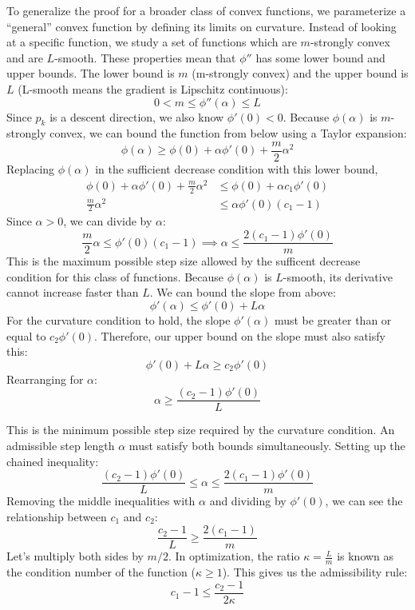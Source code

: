 To generalize the proof for a broader class of convex functions, we parameterize a ``general'' convex function by defining its limits on curvature. Instead of looking at a specific function, we study a set of functions which are $m$-strongly convex and are $L$-smooth.
These properties mean that $\phi''$ has some lower bound and upper bounds. The lower bound is $m$ (m-strongly convex) and the upper bound is $L$ (L-smooth means the gradient is Lipschitz continuous):
\[
    0 < m \leq \phi''(\alpha) \leq L
\]
Since $p_k$ is a descent direction, we also know $\phi'(0) < 0$.
Because $\phi(\alpha)$ is $m$-strongly convex, we can bound the function from below using a Taylor expansion:
\[
    \phi(\alpha) \geq \phi(0) + \alpha \phi'(0) + \frac{m}{2}\alpha^2
\]
Replacing $\phi(\alpha)$ in the sufficient decrease condition with this lower bound,
\begin{align*}
    \phi(0) + \alpha \phi'(0) + \frac{m}{2}\alpha^2 & \leq \phi(0) + \alpha c_1 \phi'(0) \\
    \frac{m}{2}\alpha^2                             & \leq \alpha \phi'(0)(c_1 - 1)
\end{align*}
Since $\alpha > 0$, we can divide by $\alpha$:
\[
    \frac{m}{2}\alpha \leq \phi'(0)(c_1 - 1) \implies \alpha \leq \frac{2(c_1 - 1)\phi'(0)}{m}
\]
This is the maximum possible step size allowed by the sufficent decrease condition for this class of functions.
Because $\phi(\alpha)$ is $L$-smooth, its derivative cannot increase faster than $L$. We can bound the slope from above:
\[
    \phi'(\alpha) \leq \phi'(0) + L\alpha
\]
For the curvature condition to hold, the slope $\phi'(\alpha)$ must be greater than or equal to $c_2 \phi'(0)$. Therefore, our upper bound on the slope must also satisfy this:
\[
    \phi'(0) + L\alpha \geq c_2 \phi'(0)
\]
Rearranging for $\alpha$:
\[
    \alpha \geq \frac{(c_2 - 1)\phi'(0)}{L}
\]

This is the minimum possible step size required by the curvature condition.
An admissible step length $\alpha$ must satisfy both bounds simultaneously. Setting up the chained inequality:
\[
    \frac{(c_2 - 1)\phi'(0)}{L} \leq \alpha \leq \frac{2(c_1 - 1)\phi'(0)}{m}
\]
Removing the middle inequalities with $\alpha$ and dividing by $\phi'(0)$, we can see the relationship between $c_1$ and $c_2$:
\[
    \frac{c_2 - 1}{L} \geq \frac{2(c_1 - 1)}{m}
\]
Let's multiply both sides by $m/2$. In optimization, the ratio $\kappa = \frac{L}{m}$ is known as the condition number of the function ($\kappa \geq 1$). This gives us the admissibility rule:
\[
    c_1 - 1 \leq \frac{c_2 - 1}{2\kappa}
\]

